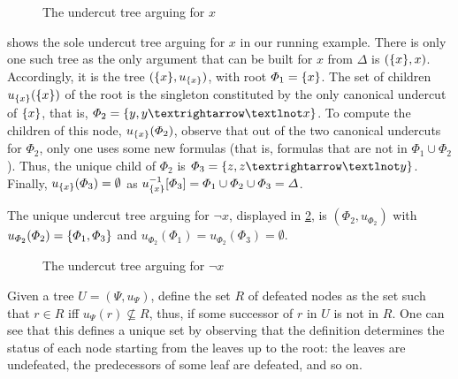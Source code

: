 \documentclass[version=3.21, pagesize, twoside=off, bibliography=totoc, DIV=calc, fontsize=12pt, a4paper, french, english]{scrartcl}
\begin{document}
\begin{figure}
	\caption{The undercut tree arguing for $x$}
	\label{fig:utx}
\end{figure}
\begin{example}
	\label{ex:abstUnder}
	 shows the sole undercut tree arguing for $x$ in our running example. There is only one such tree as the only argument that can be built for $x$ from $\Delta$ is $(\{x\}, x)$. Accordingly, it is the tree $(\{x\}, u_{\{x\}})$, with root $\Phi_1 = \{x\}$. The set of children $u_{\{x\}}(\{x\})$ of the root is the singleton constituted by the only canonical undercut of $\{x\}$, that is, $\Phi_2 = \set{y, y → ¬x}$. 
	To compute the children of this node, $u_{\{x\}}(\Phi_2)$, observe that out of the two canonical undercuts for $\Phi_2$, only one uses some new formulas (that is, formulas that are not in $\Phi_1 \cup \Phi_2$). Thus, the unique child of $\Phi_2$ is $\Phi_3 = \set{z, z → ¬y}$. 
	Finally, $u_{\{x\}}(\Phi_3) = \emptyset$ as $u_{\{x\}}^{-1}[\Phi_3] = \Phi_1 \cup \Phi_2 \cup \Phi_3 = \Delta$.
	
	The unique undercut tree arguing for $¬x$, displayed in \cref{fig:utnx}, is $(\Phi_2, u_{\Phi_2})$ with $u_{\Phi_2}(\Phi_2) = \{\Phi_1, \Phi_3\}$ and $u_{\Phi_2}(\Phi_1) = u_{\Phi_2}(\Phi_3) = \emptyset$.
\end{example}
\begin{figure}
	\caption{The undercut tree arguing for $¬x$}
	\label{fig:utnx}
\end{figure}

Given a tree $U = (\Psi, u_\Psi)$, define the set $R$ of defeated nodes as the set such that $r \in R$ iff $u_\Psi(r) \nsubseteq R$, thus, if some successor of $r$ in $U$ is not in $R$.
One can see that this defines a unique set by observing that the definition determines the status of each node starting from the leaves up to the root: the leaves are undefeated, the predecessors of some leaf are defeated, and so on.
\end{document}
